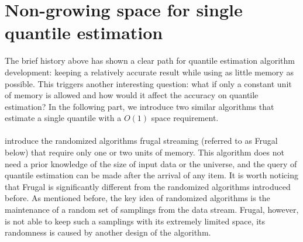 

\pagebreak


\section{Non-growing space for single quantile estimation}
\label{singlequantile}
The brief history above has shown a clear path for quantile estimation algorithm development: keeping a relatively accurate result while using as little memory as possible. This triggers another interesting question: what if only a constant unit of memory is allowed and how would it affect the accuracy on quantile estimation? In the following part, we introduce two similar algorithms that estimate a single quantile with a $O(1)$ space requirement.
\\\\
\citeauthor{maFrugalStreamingEstimating2014}\cite{maFrugalStreamingEstimating2014} introduce the randomized algorithms frugal streaming (referred to as Frugal below) that require only one or two units of memory. This algorithm does not need a prior knowledge of the size of input data or the universe, and the query of quantile estimation can be made after the arrival of any item.
It is worth noticing that Frugal is significantly different from the randomized algorithms introduced before.
As mentioned before, the key idea of randomized algorithms is the maintenance of a random set of samplings from the data stream. Frugal, however, is not able to keep such a samplings with its extremely limited space, its randomness is caused by another design of the algorithm.

